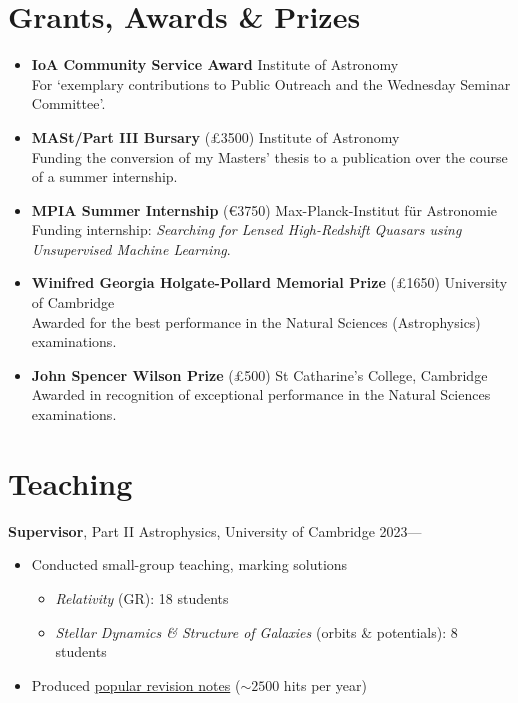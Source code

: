 \documentclass[a4paper,10pt]{article}
\begin{document}
\section*{Grants, Awards \& Prizes}
\begin{itemize}
  \item \textbf{IoA Community Service Award} \hfill Institute of Astronomy\\
    For `exemplary contributions to Public Outreach and the Wednesday Seminar Committee'.
  \item \textbf{MASt/Part III Bursary} (£3500) \hfill Institute of Astronomy\\
    Funding the conversion of my Masters' thesis to a publication over the course of a summer internship.
  \item \textbf{MPIA Summer Internship} (€3750) \hfill Max-Planck-Institut f\"{u}r Astronomie\\
    Funding internship: \textit{Searching for Lensed High-Redshift Quasars using Unsupervised Machine Learning}.
  \item \textbf{Winifred Georgia Holgate-Pollard Memorial Prize} (£1650)
    \hfill University of Cambridge\\
    Awarded for the best performance in the Natural Sciences (Astrophysics) examinations.
  \item \textbf{John Spencer Wilson Prize} (£500) \hfill St Catharine's College, Cambridge\\
    Awarded in recognition of exceptional performance in the Natural Sciences examinations.
\end{itemize}

\section*{Teaching}

\noindent \textbf{Supervisor}, Part II Astrophysics, University of Cambridge \hfill 2023---
\begin{itemize}
  \item Conducted small-group teaching, marking solutions
    \begin{itemize}
      \item \textit{Relativity} (GR): 18 students
      \item \textit{Stellar Dynamics \& Structure of Galaxies} (orbits \& potentials): 8 students
    \end{itemize}
  \item Produced \href{https://xbyrne.github.io/notes}{popular revision notes} ($\sim2500$ hits per year)
\end{itemize}
\end{document}
